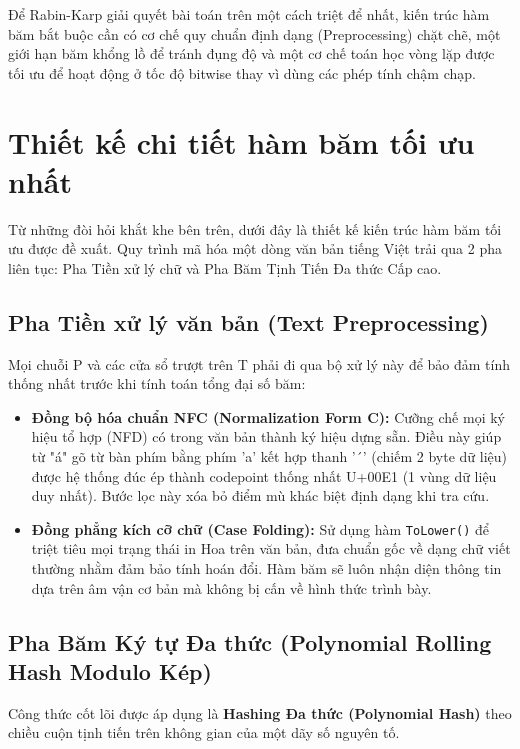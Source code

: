 \documentclass[a4paper,12pt]{article}
\begin{document}
Để Rabin-Karp giải quyết bài toán trên một cách triệt để nhất, kiến trúc hàm băm bắt buộc cần có cơ chế quy chuẩn định dạng (Preprocessing) chặt chẽ, một giới hạn băm khổng lồ để tránh đụng độ và một cơ chế toán học vòng lặp được tối ưu để hoạt động ở tốc độ bitwise thay vì dùng các phép tính chậm chạp.

\section{Thiết kế chi tiết hàm băm tối ưu nhất}

Từ những đòi hỏi khắt khe bên trên, dưới đây là thiết kế kiến trúc hàm băm tối ưu được đề xuất. Quy trình mã hóa một dòng văn bản tiếng Việt trải qua 2 pha liên tục: Pha Tiền xử lý chữ và Pha Băm Tịnh Tiến Đa thức Cấp cao.

\subsection{Pha Tiền xử lý văn bản (Text Preprocessing)}

Mọi chuỗi P và các cửa sổ trượt trên T phải đi qua bộ xử lý này để bảo đảm tính thống nhất trước khi tính toán tổng đại số băm:
\begin{itemize}
    \item \textbf{Đồng bộ hóa chuẩn NFC (Normalization Form C):} Cưỡng chế mọi ký hiệu tổ hợp (NFD) có trong văn bản thành ký hiệu dựng sẵn. Điều này giúp từ "á" gõ từ bàn phím bằng phím 'a' kết hợp thanh '´' (chiếm 2 byte dữ liệu) được hệ thống đúc ép thành codepoint thống nhất U+00E1 (1 vùng dữ liệu duy nhất). Bước lọc này xóa bỏ điểm mù khác biệt định dạng khi tra cứu.
    \item \textbf{Đồng phẳng kích cỡ chữ (Case Folding):} Sử dụng hàm \texttt{ToLower()} để triệt tiêu mọi trạng thái in Hoa trên văn bản, đưa chuẩn gốc về dạng chữ viết thường nhằm đảm bảo tính hoán đổi. Hàm băm sẽ luôn nhận diện thông tin dựa trên âm vận cơ bản mà không bị cấn về hình thức trình bày.
\end{itemize}

\subsection{Pha Băm Ký tự Đa thức (Polynomial Rolling Hash Modulo Kép)}

Công thức cốt lõi được áp dụng là \textbf{Hashing Đa thức (Polynomial Hash)} theo chiều cuộn tịnh tiến trên không gian của một dãy số nguyên tố. 
\end{document}
